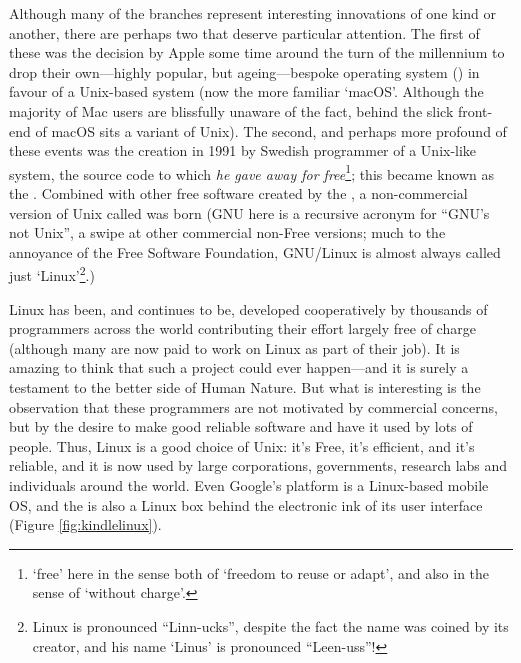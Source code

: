 Although many of the branches represent interesting innovations of one
kind or another, there are perhaps two that deserve particular
attention. The first of these was the decision by Apple some time
around the turn of the millennium to drop their own---highly popular,
but ageing---bespoke operating system ()
in favour of a Unix-based system (now the more familiar
`macOS'. Although the majority of Mac users are blissfully unaware of
the fact, behind the slick front-end of macOS sits a variant of
Unix). The second, and perhaps more profound of these events was the
creation in 1991 by Swedish programmer
 of a Unix-like system, the
source code to which \emph{he gave away for free}\footnote{`free' here
  in the sense both of `freedom to reuse or adapt', and also in the
  sense of `without charge'.}; this became known as the
. Combined with other free
software created by the , a non-commercial version of Unix called
 was born (GNU here is a recursive
acronym for ``GNU's not Unix'', a swipe at other commercial non-Free
versions; much to the annoyance of the Free Software Foundation,
GNU/Linux is almost always called just `Linux'\footnote{Linux is
  pronounced ``Linn-ucks'', despite the fact the name was coined by
  its creator, and his name `Linus' is pronounced ``Leen-uss''!}.)

Linux has been, and continues to be, developed cooperatively by
thousands of programmers across the world contributing their effort
largely free of charge (although many are now paid to work on Linux as
part of their job). It is amazing to think that such a project could
ever happen---and it is surely a testament to the better side of Human
Nature. But what is interesting is the observation that these
programmers are not motivated by commercial concerns, but by the
desire to make good reliable software and have it used by lots of
people. Thus, Linux is a good choice of Unix: it's Free, it's
efficient, and it's reliable, and it is now used by large
corporations, governments, research labs and individuals around the
world. Even Google's 
platform is a Linux-based mobile OS, and the
 is also a Linux box behind
the electronic ink of its user interface (Figure
\ref{fig:kindlelinux}).

